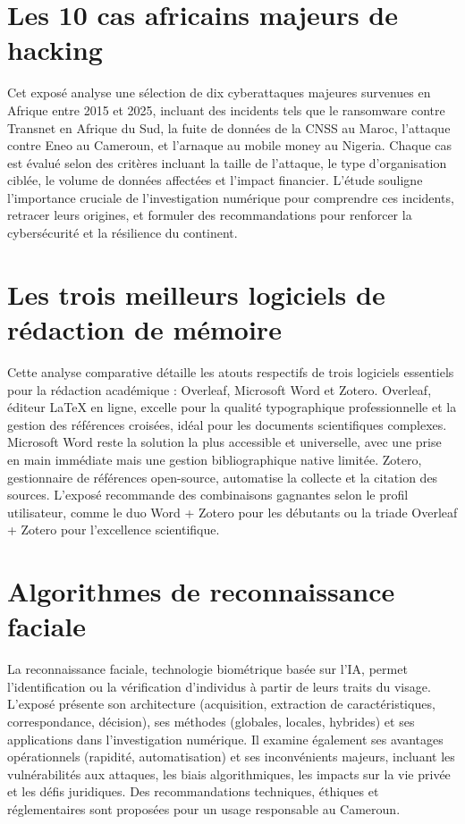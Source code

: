 \documentclass[12pt, a4paper]{article}
\begin{document}
\section{Les 10 cas africains majeurs de hacking}

Cet exposé analyse une sélection de dix cyberattaques majeures survenues en Afrique entre 2015 et 2025, incluant des incidents tels que le ransomware contre Transnet en Afrique du Sud, la fuite de données de la CNSS au Maroc, l'attaque contre Eneo au Cameroun, et l'arnaque au mobile money au Nigeria. Chaque cas est évalué selon des critères incluant la taille de l'attaque, le type d'organisation ciblée, le volume de données affectées et l'impact financier. L'étude souligne l'importance cruciale de l'investigation numérique pour comprendre ces incidents, retracer leurs origines, et formuler des recommandations pour renforcer la cybersécurité et la résilience du continent.

\section{Les trois meilleurs logiciels de rédaction de mémoire}

Cette analyse comparative détaille les atouts respectifs de trois logiciels essentiels pour la rédaction académique : Overleaf, Microsoft Word et Zotero. Overleaf, éditeur LaTeX en ligne, excelle pour la qualité typographique professionnelle et la gestion des références croisées, idéal pour les documents scientifiques complexes. Microsoft Word reste la solution la plus accessible et universelle, avec une prise en main immédiate mais une gestion bibliographique native limitée. Zotero, gestionnaire de références open-source, automatise la collecte et la citation des sources. L'exposé recommande des combinaisons gagnantes selon le profil utilisateur, comme le duo Word + Zotero pour les débutants ou la triade Overleaf + Zotero pour l'excellence scientifique.

\section{Algorithmes de reconnaissance faciale}

La reconnaissance faciale, technologie biométrique basée sur l'IA, permet l'identification ou la vérification d'individus à partir de leurs traits du visage. L'exposé présente son architecture (acquisition, extraction de caractéristiques, correspondance, décision), ses méthodes (globales, locales, hybrides) et ses applications dans l'investigation numérique. Il examine également ses avantages opérationnels (rapidité, automatisation) et ses inconvénients majeurs, incluant les vulnérabilités aux attaques, les biais algorithmiques, les impacts sur la vie privée et les défis juridiques. Des recommandations techniques, éthiques et réglementaires sont proposées pour un usage responsable au Cameroun.
\end{document}
